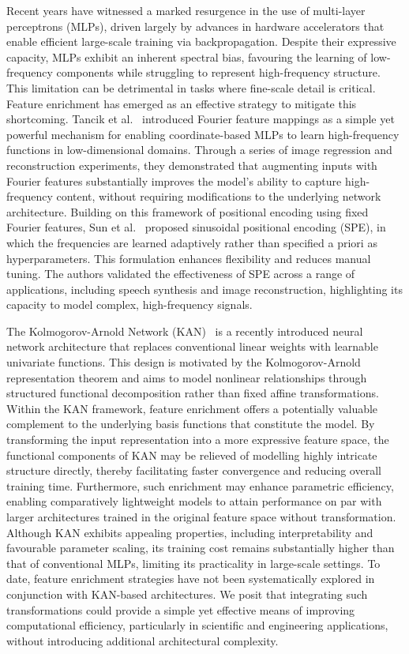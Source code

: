 \documentclass{article}
\begin{document}
Recent years have witnessed a marked resurgence in the use of multi-layer perceptrons (MLPs), driven largely by advances in hardware accelerators that enable efficient large-scale training via backpropagation. Despite their expressive capacity, MLPs exhibit an inherent spectral bias, favouring the learning of low-frequency components while struggling to represent high-frequency structure. This limitation can be detrimental in tasks where fine-scale detail is critical. Feature enrichment has emerged as an effective strategy to mitigate this shortcoming. Tancik et al.~\cite{tancik2020fourier} introduced Fourier feature mappings as a simple yet powerful mechanism for enabling coordinate-based MLPs to learn high-frequency functions in low-dimensional domains. Through a series of image regression and reconstruction experiments, they demonstrated that augmenting inputs with Fourier features substantially improves the model’s ability to capture high-frequency content, without requiring modifications to the underlying network architecture. Building on this framework of positional encoding using fixed Fourier features, Sun et al.~\cite{sun2024learning} proposed sinusoidal positional encoding (SPE), in which the frequencies are learned adaptively rather than specified a priori as hyperparameters. This formulation enhances flexibility and reduces manual tuning. The authors validated the effectiveness of SPE across a range of applications, including speech synthesis and image reconstruction, highlighting its capacity to model complex, high-frequency signals.

The Kolmogorov-Arnold Network (KAN)~\cite{liu2024kan} is a recently introduced neural network architecture that replaces conventional linear weights with learnable univariate functions. This design is motivated by the Kolmogorov-Arnold representation theorem and aims to model nonlinear relationships through structured functional decomposition rather than fixed affine transformations. Within the KAN framework, feature enrichment offers a potentially valuable complement to the underlying basis functions that constitute the model. By transforming the input representation into a more expressive feature space, the functional components of KAN may be relieved of modelling highly intricate structure directly, thereby facilitating faster convergence and reducing overall training time. Furthermore, such enrichment may enhance parametric efficiency, enabling comparatively lightweight models to attain performance on par with larger architectures trained in the original feature space without transformation. Although KAN exhibits appealing properties, including interpretability and favourable parameter scaling, its training cost remains substantially higher than that of conventional MLPs, limiting its practicality in large-scale settings. To date, feature enrichment strategies have not been systematically explored in conjunction with KAN-based architectures. We posit that integrating such transformations could provide a simple yet effective means of improving computational efficiency, particularly in scientific and engineering applications, without introducing additional architectural complexity.
\end{document}
